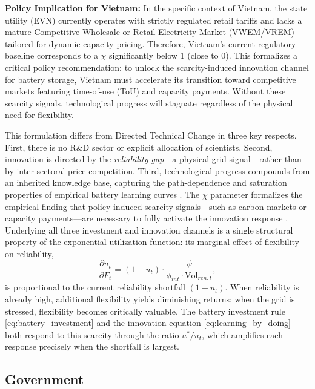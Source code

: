 \documentclass[12pt, a4paper]{article}
\begin{document}
\textbf{Policy Implication for Vietnam:} In the specific context of Vietnam, the state utility (EVN) currently operates with strictly regulated retail tariffs and lacks a mature Competitive Wholesale or Retail Electricity Market (VWEM/VREM) tailored for dynamic capacity pricing. Therefore, Vietnam's current regulatory baseline corresponds to a $\chi$ significantly below 1 (close to 0). This formalizes a critical policy recommendation: to unlock the scarcity-induced innovation channel for battery storage, Vietnam must accelerate its transition toward competitive markets featuring time-of-use (ToU) and capacity payments. Without these scarcity signals, technological progress will stagnate regardless of the physical need for flexibility.

This formulation differs from Directed Technical Change in three key respects. First, there is no R\&D sector or explicit allocation of scientists. Second, innovation is directed by the \textit{reliability gap}---a physical grid signal---rather than by inter-sectoral price competition. Third, technological progress compounds from an inherited knowledge base, capturing the path-dependence and saturation properties of empirical battery learning curves \citep{kittner2017, way2022}. The $\chi$ parameter formalizes the empirical finding that policy-induced scarcity signals---such as carbon markets or capacity payments---are necessary to fully activate the innovation response \citep{calel2016, aghion2016}. Underlying all three investment and innovation channels is a single structural property of the exponential utilization function: its marginal effect of flexibility on reliability,
\begin{equation}
\frac{\partial u_t}{\partial F_t} = (1 - u_t) \cdot \frac{\psi}{\phi_{int} \cdot \text{Vol}_{ren,t}},
\end{equation}
is proportional to the current reliability shortfall $(1-u_t)$. When reliability is already high, additional flexibility yields diminishing returns; when the grid is stressed, flexibility becomes critically valuable. The battery investment rule \eqref{eq:battery_investment} and the innovation equation \eqref{eq:learning_by_doing} both respond to this scarcity through the ratio $u^*/u_t$, which amplifies each response precisely when the shortfall is largest.


\subsection{Government} \label{sec:government}
\end{document}
